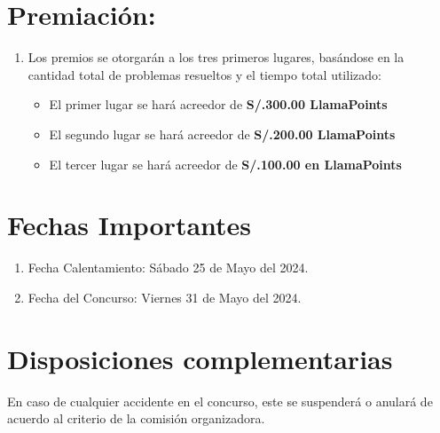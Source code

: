 \documentclass{article}
\begin{document}
\begin{itemize}
          \section{Premiación:}
          \begin{enumerate}
              \item Los premios se otorgarán a los tres primeros lugares, basándose en la cantidad total de
                    problemas resueltos y el tiempo total utilizado:
                    \begin{itemize}
                        \item El primer lugar se hará acreedor de \textbf{S/.300.00 LlamaPoints}
                        \item El segundo lugar se hará acreedor de \textbf{S/.200.00 LlamaPoints}
                        \item El tercer lugar se hará acreedor de \textbf{S/.100.00 en LlamaPoints}
                    \end{itemize}
          \end{enumerate}
          \section{Fechas Importantes}
          \begin{enumerate}
              \item Fecha Calentamiento: Sábado 25 de Mayo del 2024.
              \item Fecha del Concurso: Viernes 31 de Mayo del 2024.
          \end{enumerate}
          \section{Disposiciones complementarias}
          En caso de cualquier accidente en el concurso, este se suspenderá o anulará de
          acuerdo al criterio de la comisión organizadora.



\end{itemize}
\end{document}

